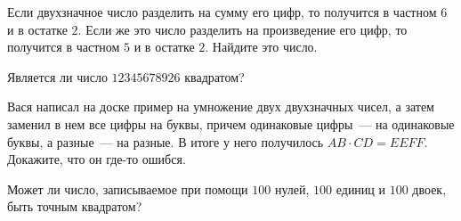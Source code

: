 \begin{problems}
\item
Если двухзначное число разделить на сумму его цифр, то получится в частном $6$ и
в остатке $2$.
Если же это число разделить на произведение его цифр, то получится в частном
$5$ и в остатке $2$.
Найдите это число.

\item
Является ли число $12345678926$ квадратом?

\item
Вася написал на доске пример на умножение двух двухзначных чисел, а затем
заменил в нем все цифры на буквы, причем одинаковые цифры~--- на одинаковые
буквы, а разные~--- на разные.
В итоге у него получилось $AB \cdot CD = EEFF$.
Докажите, что он где-то ошибся.

\item
Может ли число, записываемое при помощи $100$ нулей, $100$ единиц и $100$
двоек, быть точным квадратом?

\end{problems}

